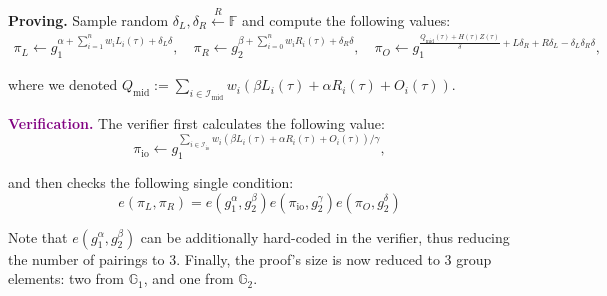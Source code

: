 \documentclass[../lecture-notes.tex]{subfiles}
\begin{document}
\textcolor{green!50!black}{\textbf{Proving.}} Sample random $\delta_L,\delta_R \xleftarrow{R} \mathbb{F}$ and compute the following values:
\begin{gather*}
    \pi_L \gets g_1^{\alpha + \sum_{i=1}^n w_iL_i(\tau) + \delta_L\delta}, \quad \pi_R \gets g_2^{\beta + \sum_{i=0}^n w_iR_i(\tau) + \delta_R\delta}, \quad \pi_O \gets g_1^{\frac{Q_{\text{mid}}(\tau)+H(\tau)Z(\tau)}{\delta} + L\delta_R + R\delta_L - \delta_L\delta_R\delta},
\end{gather*}

where we denoted $Q_{\text{mid}} := \sum_{i \in \mathcal{I}_{\text{mid}}}w_i(\beta L_i(\tau) + \alpha R_i(\tau) + O_i(\tau))$.

\textcolor{purple}{\textbf{Verification.}} The verifier first calculates the following value:
\begin{equation*}
    \pi_{\text{io}} \gets g_1^{\sum_{i \in \mathcal{I}_{\text{io}}}w_i(\beta L_i(\tau) + \alpha R_i(\tau) + O_i(\tau))/\gamma},
\end{equation*}

and then checks the following single condition:
\begin{equation*}
    e(\pi_L, \pi_R) = e(g_1^{\alpha}, g_2^{\beta})e(\pi_{\text{io}},g_2^{\gamma})e(\pi_O,g_2^{\delta})
\end{equation*}

Note that $e(g_1^{\alpha}, g_2^{\beta})$ can be additionally hard-coded in the verifier, thus reducing the number of pairings to 3. Finally, the proof's size is now reduced to 3 group elements: two from $\mathbb{G}_1$, and one from $\mathbb{G}_2$.
\end{document}
